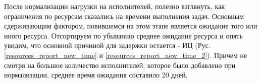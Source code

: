 После нормализации нагрузки на исполнителей, полезно
взглянуть, как ограничения по ресурсам сказались на времени
выполнения задач. Основным сдерживающим фактором, повившемся
на этом этапе является ожидание того или иного ресурса.
Отсортируем по убыванию среднее ожидание ресурса и
опять увидим, что основной причиной для задержки остается -
ИЦ (Рус. \ref{resources_report_new_time} и
\ref{resources_report_new_time_2}). Причем не смотря
на большое количество исполнителей, которое было добавлено
при нормализации, среднее время ожидания составило 20 дней.



